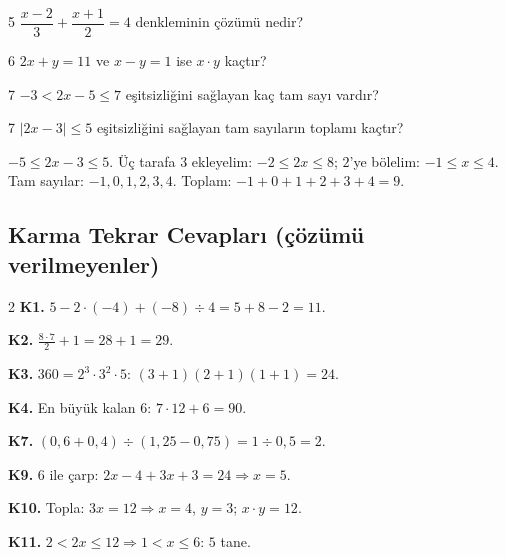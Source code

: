 \begin{karma}{5}
\(\dfrac{x-2}{3}+\dfrac{x+1}{2}=4\) denkleminin çözümü nedir?
\end{karma}

\begin{karma}{6}
\(2x+y=11\) ve \(x-y=1\) ise \(x\cdot y\) kaçtır?
\end{karma}

\begin{karma}{7}
\(-3<2x-5\le 7\) eşitsizliğini sağlayan kaç tam sayı vardır?
\end{karma}

\begin{karma}{7}
\(|2x-3|\le 5\) eşitsizliğini sağlayan tam sayıların toplamı kaçtır?
\end{karma}
\begin{cozum}
\(-5\le 2x-3\le 5\). Üç tarafa \(3\) ekleyelim: \(-2\le 2x\le 8\); \(2\)'ye bölelim: \(-1\le x\le 4\).\\
Tam sayılar: \(-1,0,1,2,3,4\). \quad Toplam: \(-1+0+1+2+3+4=9\).
\end{cozum}

\subsection*{Karma Tekrar Cevapları (çözümü verilmeyenler)}
{\small
\begin{multicols}{2}
\textbf{K1.} \(5-2\cdot(-4)+(-8)\div 4=5+8-2=11\).\par
\textbf{K2.} \(\tfrac{8\cdot 7}{2}+1=28+1=29\).\par
\textbf{K3.} \(360=2^3\cdot 3^2\cdot 5\): \((3+1)(2+1)(1+1)=24\).\par
\textbf{K4.} En büyük kalan \(6\): \(7\cdot 12+6=90\).\par
\textbf{K7.} \((0{,}6+0{,}4)\div(1{,}25-0{,}75)=1\div 0{,}5=2\).\par
\textbf{K9.} \(6\) ile çarp: \(2x-4+3x+3=24\Rightarrow x=5\).\par
\textbf{K10.} Topla: \(3x=12\Rightarrow x=4\), \(y=3\); \(x\cdot y=12\).\par
\textbf{K11.} \(2<2x\le 12\Rightarrow 1<x\le 6\): \(5\) tane.\par
\end{multicols}}
